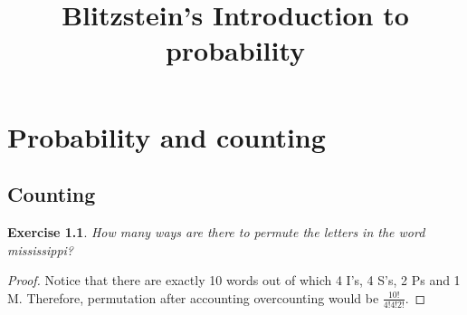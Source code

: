 \documentclass[12pt,oneside,a4paper]{book}
\title{Blitzstein's Introduction to probability}
\author{}
\theoremstyle{plain}
\newtheorem{exercise}[theorem]{Exercise}
\theoremstyle{definition}
\theoremstyle{remark}
\begin{document}
  \maketitle
  
  \chapter{Probability and counting}
  \section{Counting}

  \begin{exercise}{1}
    How many ways are there to permute the letters in the word mississippi?
  \end{exercise} 
  \begin{proof}
    Notice that there are exactly 10 words out of which 4 I's, 4 S's, 2 Ps and 1 M. Therefore, permutation after accounting overcounting would be $\frac{10!}{4!4!2!}$. 
  \end{proof}
\end{document}
